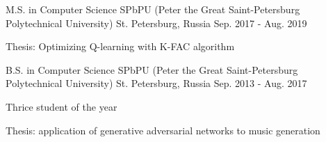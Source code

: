 

\begin{cventries}

  \cventry
	{M.S. in Computer Science} %
	{SPbPU (Peter the Great Saint-Petersburg Polytechnical University)} %
	{St. Petersburg, Russia} %
	{Sep. 2017 - Aug. 2019} %
	{
	 	\begin{cvitems} %
	 		\item {Thesis: Optimizing Q-learning with K-FAC algorithm}
	 	\end{cvitems}
	}
    

  \cventry
	{B.S. in Computer Science} %
	{SPbPU (Peter the Great Saint-Petersburg Polytechnical University)} %
	{St. Petersburg, Russia} %
	{Sep. 2013 - Aug. 2017} %
	{
		\begin{cvitems} %
			\item {Thrice student of the year}
			\item {Thesis: application of generative adversarial networks to music generation}
		\end{cvitems}
	}

\end{cventries}
